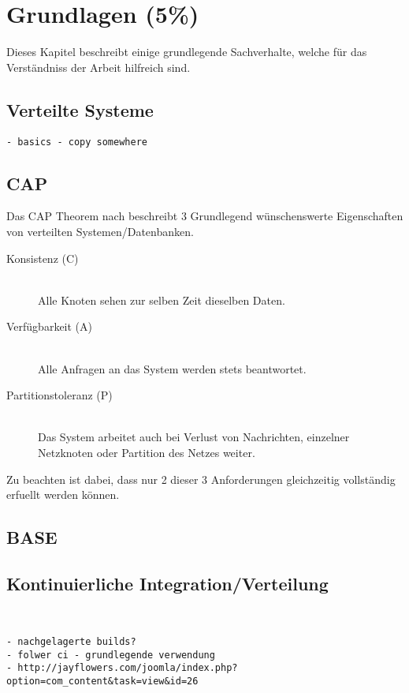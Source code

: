 \chapter{Grundlagen (5\%)}
\label{chap:base}
Dieses Kapitel beschreibt einige grundlegende Sachverhalte,
welche f\"ur das Verst\"andniss der Arbeit hilfreich sind.

\section{Verteilte Systeme}
\label{sec:base:vs}

\begin{verbatim}
- basics - copy somewhere
\end{verbatim}

\section{CAP}
\label{sec:base:cap}


Das CAP Theorem nach \cite{brewer:cap} beschreibt 3 Grundlegend
w\"unschenswerte Eigenschaften von verteilten Systemen/Datenbanken.

\begin{description}
  \item[Konsistenz (C)] \hfill \\
      Alle Knoten sehen zur selben Zeit dieselben Daten. 
  \item[Verf\"ugbarkeit (A)] \hfill \\
      Alle Anfragen an das System werden stets beantwortet.
  \item[Partitionstoleranz (P)] \hfill \\
      Das System arbeitet auch bei Verlust von Nachrichten,
      einzelner Netzknoten oder Partition des Netzes weiter.
\end{description}

Zu beachten ist dabei, dass nur 2 dieser 3 Anforderungen gleichzeitig
vollst\"andig erfuellt werden k\"onnen.






\section{BASE}
\label{sec:base:base}

\section{Kontinuierliche Integration/Verteilung}
\label{sec:base:ci}
\begin{verbatim}


- nachgelagerte builds?
- folwer ci - grundlegende verwendung
- http://jayflowers.com/joomla/index.php?option=com_content&task=view&id=26
\end{verbatim}

